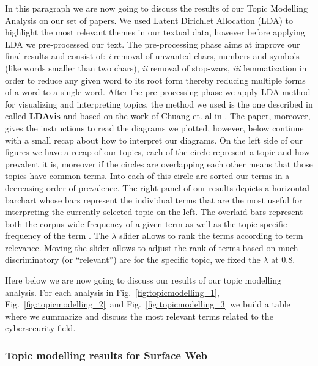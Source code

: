 In this paragraph we are now going to discuss the results of our Topic Modelling Analysis on our set of papers. We used Latent Dirichlet Allocation (LDA) to highlight the most relevant themes in our textual data, however before applying LDA we pre-processed our text. The pre-processing phase aims at improve our final results and consist of: \emph{i} removal of unwanted chars, numbers and symbols (like words smaller than two chars), \emph{ii} removal of stop-wars, \emph{iii} lemmatization in order to reduce any given word to its root form thereby reducing multiple forms of a word to a single word.
After the pre-processing phase we apply LDA method for visualizing and interpreting topics, the method we used is the one described in \cite{W14-3110} called \textbf{LDAvis} and based on the work of Chuang et. al in \cite{Chuang:2012:TVT:2254556.2254572}. The paper, moreover, gives the instructions to read the diagrams we plotted, however, below continue with a small recap about how to interpret our diagrams. 
On the left side of our figures we have a recap of our topics, each of the circle represent a topic and how prevalent it is, moreover if the circles are overlapping each other means that those topics have common terms. Into each of this circle are sorted our terms in a decreasing order of prevalence.
The right panel of our results depicts a horizontal barchart whose bars represent the individual terms that are the most useful for interpreting the currently selected topic on the left. The overlaid bars represent both the corpus-wide frequency of a given term as well as the topic-specific frequency of the term \cite{W14-3110, Chuang:2012:TVT:2254556.2254572}. The $\lambda$ slider allows to rank the terms according to term relevance. Moving the slider allows to adjust the rank of terms based on much discriminatory (or ``relevant'') are for the specific topic, we fixed the $\lambda$ at 0.8.

Here below we are now going to discuss our results of our topic modelling analysis. For each analysis in Fig.~\ref{fig:topicmodelling_1}, Fig.~\ref{fig:topicmodelling_2}~and Fig.~\ref{fig:topicmodelling_3}  we build a table where we summarize and discuss the most relevant terms related to the cybersecurity field. 

\subsubsection{Topic modelling results for Surface Web}


